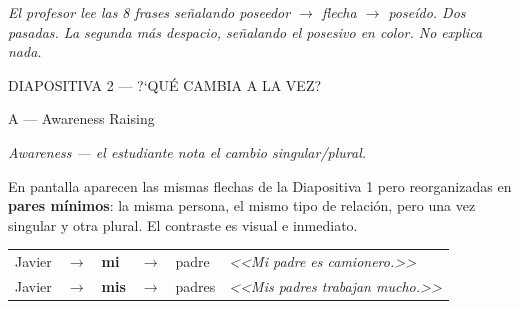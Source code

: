 \documentclass[a4paper,10pt]{article}
\renewcommand{\arraystretch}{1.3}
\newcommand{\pos}[1]{\textbf{\textcolor{purpura}{#1}}}
\begin{document}
\vspace{0.4cm}

\textit{El profesor lee las 8 frases se\~{n}alando poseedor $\rightarrow$ flecha $\rightarrow$ pose\'ido. Dos pasadas. La segunda m\'as despacio, se\~{n}alando el posesivo en color. No explica nada.}

\newpage


\begin{diapoheader}{DIAPOSITIVA 2 --- ?`QU\'E CAMBIA A LA VEZ?}
\end{diapoheader}

\vspace{0.3cm}

\begin{marsfase}{A --- Awareness Raising}
\end{marsfase}

\vspace{0.2cm}

\textit{Awareness --- el estudiante nota el cambio singular/plural.}

\vspace{0.3cm}

En pantalla aparecen las mismas flechas de la Diapositiva 1 pero reorganizadas en \textbf{pares m\'inimos}: la misma persona, el mismo tipo de relaci\'on, pero una vez singular y otra plural. El contraste es visual e inmediato.

\vspace{0.5cm}

\begin{tcolorbox}[colback=white, colframe=purpura!60, title={\textbf{Par 1}}, fonttitle=\bfseries\color{purpura}, colbacktitle=purpura!10, arc=3pt, boxrule=0.8pt]
\renewcommand{\arraystretch}{1.6}
\begin{tabular}{>{\raggedleft\arraybackslash}p{3cm} c >{\centering\arraybackslash}p{1.5cm} c >{\raggedright\arraybackslash}p{3cm} p{5cm}}
Javier & $\rightarrow$ & \pos{mi} & $\rightarrow$ & padre & \textit{<<Mi padre es camionero.>>} \\
Javier & $\rightarrow$ & \pos{mis} & $\rightarrow$ & padres & \textit{<<Mis padres trabajan mucho.>>} \\
\end{tabular}
\end{tcolorbox}
\end{document}
